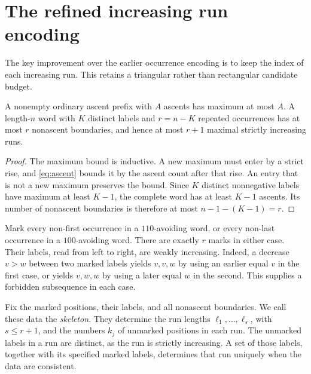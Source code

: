 \section{The refined increasing run encoding}\label{sec:upper}
The key improvement over the earlier occurrence encoding is to keep the index of each increasing run. This retains a triangular rather than rectangular candidate budget.

\begin{lemma}\label{lem:prefix}
A nonempty ordinary ascent prefix with $A$ ascents has maximum at most $A$. A length-$n$ word with $K$ distinct labels and $r=n-K$ repeated occurrences has at most $r$ nonascent boundaries, and hence at most $r+1$ maximal strictly increasing runs.
\end{lemma}
\begin{proof}
The maximum bound is inductive. A new maximum must enter by a strict rise, and \eqref{eq:ascent} bounds it by the ascent count after that rise. An entry that is not a new maximum preserves the bound. Since $K$ distinct nonnegative labels have maximum at least $K-1$, the complete word has at least $K-1$ ascents. Its number of nonascent boundaries is therefore at most $n-1-(K-1)=r$.
\end{proof}

Mark every non-first occurrence in a $110$-avoiding word, or every non-last occurrence in a $100$-avoiding word. There are exactly $r$ marks in either case. Their labels, read from left to right, are weakly increasing. Indeed, a decrease $v>w$ between two marked labels yields $v,v,w$ by using an earlier equal $v$ in the first case, or yields $v,w,w$ by using a later equal $w$ in the second. This supplies a forbidden subsequence in each case.

Fix the marked positions, their labels, and all nonascent boundaries. We call these data the \emph{skeleton}. They determine the run lengths $\ell_1,\ldots,\ell_s$, with $s\le r+1$, and the numbers $k_j$ of unmarked positions in each run. The unmarked labels in a run are distinct, as the run is strictly increasing. A set of those labels, together with its specified marked labels, determines that run uniquely when the data are consistent.

